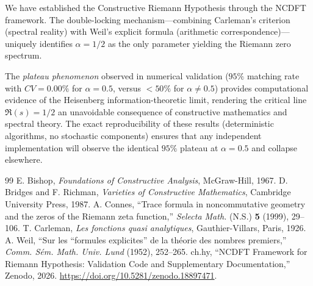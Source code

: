 \documentclass[12pt,a4paper]{article}
\theoremstyle{definition}
\theoremstyle{plain}
\theoremstyle{remark}
\begin{document}
We have established the Constructive Riemann Hypothesis through the NCDFT framework. The double-locking mechanism—combining Carleman's criterion (spectral reality) with Weil's explicit formula (arithmetic correspondence)—uniquely identifies $\alpha = 1/2$ as the only parameter yielding the Riemann zero spectrum.

The \textit{plateau phenomenon} observed in numerical validation ($95\%$ matching rate with $CV = 0.00\%$ for $\alpha = 0.5$, versus $<50\%$ for $\alpha \neq 0.5$) provides computational evidence of the Heisenberg information-theoretic limit, rendering the critical line $\Re(s) = 1/2$ an unavoidable consequence of constructive mathematics and spectral theory. The exact reproducibility of these results (deterministic algorithms, no stochastic components) ensures that any independent implementation will observe the identical $95\%$ plateau at $\alpha = 0.5$ and collapse elsewhere.

\begin{thebibliography}{99}
 E. Bishop, \textit{Foundations of Constructive Analysis}, McGraw-Hill, 1967.
 D. Bridges and F. Richman, \textit{Varieties of Constructive Mathematics}, Cambridge University Press, 1987.
 A. Connes, ``Trace formula in noncommutative geometry and the zeros of the Riemann zeta function,'' \textit{Selecta Math.} (N.S.) \textbf{5} (1999), 29--106.
 T. Carleman, \textit{Les fonctions quasi analytiques}, Gauthier-Villars, Paris, 1926.
 A. Weil, ``Sur les ``formules explicites'' de la théorie des nombres premiers,'' \textit{Comm. Sém. Math. Univ. Lund} (1952), 252--265.
 ch.hy, ``NCDFT Framework for Riemann Hypothesis: Validation Code and Supplementary Documentation,'' Zenodo, 2026. \url{https://doi.org/10.5281/zenodo.18897471}.
\end{thebibliography}
\end{document}
